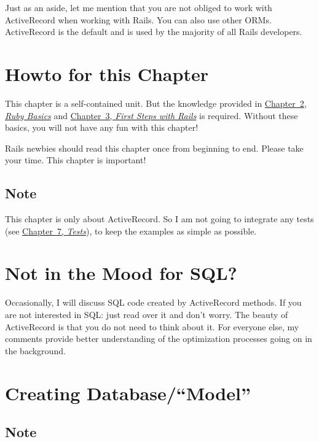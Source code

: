 \documentclass[a4paper]{book}
\newcounter{tab}[chapter]
\begin{document}
Just as an aside, let me mention that you are not obliged to work with ActiveRecord when working with Rails. You can also use other ORMs. ActiveRecord is the default and is used by the majority of all Rails developers.

\section{Howto for this Chapter}\label{howto-for-this-chapter}

This chapter is a self-contained unit. But the knowledge provided in \hyperref[ruby-grundlagen]{Chapter~2, \emph{Ruby Basics}} and \hyperref[ersteux5fschritteux5fmitux5frails]{Chapter~3, \emph{First Steps with Rails}} is required. Without these basics, you will not have any fun with this chapter!

Rails newbies should read this chapter once from beginning to end. Please take your time. This chapter is important!

\subsection{Note}\label{note-21}

This chapter is only about ActiveRecord. So I am not going to integrate any tests (see \hyperref[testing]{Chapter~7, \emph{Tests}}), to keep the examples as simple as possible.

\section{Not in the Mood for SQL?}\label{not-in-the-mood-for-sql}

Occasionally, I will discuss SQL code created by ActiveRecord methods. If you are not interested in SQL: just read over it and don't worry. The beauty of ActiveRecord is that you do not need to think about it. For everyone else, my comments provide better understanding of the optimization processes going on in the background.

\section{Creating Database/“Model”}\label{creating-databasemodel}

\subsection{Note}\label{note-22}
\end{document}
